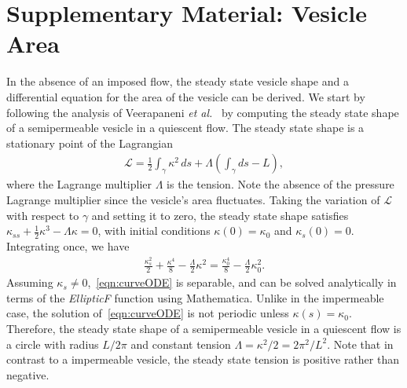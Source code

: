 \documentclass[9pt,twocolumn,twoside,lineno]{pnas-new}
\begin{document}
\section*{Supplementary Material: Vesicle Area}
In the absence of an imposed flow, the steady state vesicle shape and a
differential equation for the area of the vesicle can be derived. We
start by following the analysis of Veerapaneni {\em et
al.}~\cite{vee-raj-bir-pur2009} by computing the steady state shape of a
semipermeable vesicle in a quiescent flow. The steady state shape is a
stationary point of the Lagrangian
\begin{align}
  \mathcal{L} = \frac{1}{2}\int_{\gamma} \kappa^2 \, ds +
    \Lambda \left(\int_{\gamma} ds  - L \right),
\end{align}
where the Lagrange multiplier $\Lambda$ is the tension. Note the absence
of the pressure Lagrange multiplier since the vesicle's area fluctuates.
Taking the variation of $\mathcal{L}$ with respect to $\gamma$ and
setting it to zero, the steady state shape satisfies $\kappa_{ss} +
\frac{1}{2}\kappa^3 - \Lambda \kappa = 0$, with initial conditions
$\kappa(0) = \kappa_0$ and $\kappa_s(0) = 0$.  Integrating once, we have
\begin{align}
  \frac{\kappa_s^2}{2} + \frac{\kappa^4}{8} - 
    \frac{\Lambda}{2}\kappa^2 = \frac{\kappa_0^4}{8} - 
    \frac{\Lambda}{2}\kappa_0^2.
  \label{eqn:curveODE}
\end{align}
Assuming $\kappa_s \neq 0$,~\eqref{eqn:curveODE} is separable, and can
be solved analytically in terms of the {\em EllipticF} function using
Mathematica. Unlike in the impermeable case, the solution
of~\eqref{eqn:curveODE} is not periodic unless $\kappa(s) = \kappa_0$.
Therefore, the steady state shape of a semipermeable vesicle in a
quiescent flow is a circle with radius $L/2\pi$ and constant tension
$\Lambda = \kappa^2/2 = 2\pi^2/L^2.$ Note that in contrast to a
impermeable vesicle, the steady state tension is positive rather than
negative.
\end{document}
